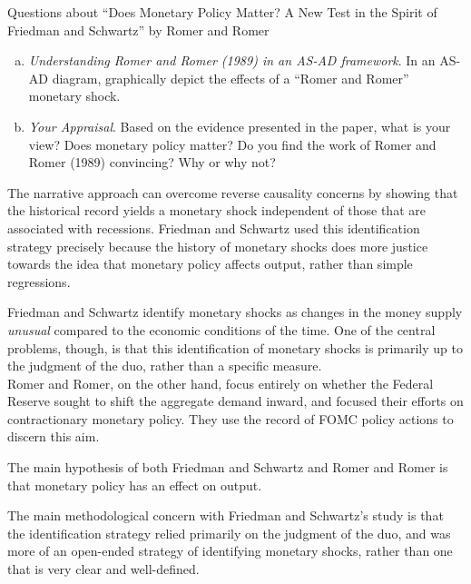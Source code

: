 \documentclass[10pt]{extarticle}
\begin{document}
{\begin{problem}{Questions about ``Does Monetary Policy Matter? A New Test in the Spirit of Friedman and Schwartz'' by Romer and Romer}
\begin{enumerate}[(a)]
      \item \textit{Understanding Romer and Romer (1989) in an AS-AD framework}. In an AS-AD diagram, graphically depict the effects of a ``Romer and Romer'' monetary shock.
      \item \textit{Your Appraisal}. Based on the evidence presented in the paper, what is your view? Does monetary policy matter? Do you find the work of Romer and Romer (1989) convincing? Why or why not?
    \end{enumerate}
    \tcblower
    \begin{tcolorbox}[colback = white, title = (a), breakable]
      The narrative approach can overcome reverse causality concerns by showing that the historical record yields a monetary shock independent of those that are associated with recessions. Friedman and Schwartz used this identification strategy precisely because the history of monetary shocks does more justice towards the idea that monetary policy affects output, rather than simple regressions.
    \end{tcolorbox}
    \begin{tcolorbox}[colback = white, title = (b), breakable]
      Friedman and Schwartz identify monetary shocks as changes in the money supply \textit{unusual} compared to the economic conditions of the time. One of the central problems, though, is that this identification of monetary shocks is primarily up to the judgment of the duo, rather than a specific measure.\\

      Romer and Romer, on the other hand, focus entirely on whether the Federal Reserve sought to shift the aggregate demand inward, and focused their efforts on contractionary monetary policy. They use the record of FOMC policy actions to discern this aim.
    \end{tcolorbox}
    \begin{tcolorbox}[colback = white, title = (c), breakable]
      The main hypothesis of both Friedman and Schwartz and Romer and Romer is that monetary policy has an effect on output.
    \end{tcolorbox}
    \begin{tcolorbox}[colback = white, title = (d), breakable]
      The main methodological concern with Friedman and Schwartz's study is that the identification strategy relied primarily on the judgment of the duo, and was more of an open-ended strategy of identifying monetary shocks, rather than one that is very clear and well-defined.\\


\end{tcolorbox}
\end{problem}}
\end{document}
